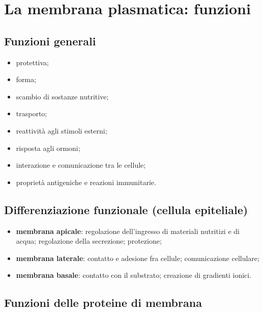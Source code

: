 \section{La membrana plasmatica: funzioni}

\subsection{Funzioni generali}

\begin{itemize}
  \item protettiva;
  \item forma;
  \item scambio di sostanze nutritive;
  \item trasporto;
  \item reattività agli stimoli esterni;
  \item risposta agli ormoni;
  \item interazione e comunicazione tra le cellule;
  \item proprietà antigeniche e reazioni immunitarie.
\end{itemize}

\subsection{Differenziazione funzionale (cellula epiteliale)}

\begin{itemize}
  \item \textbf{membrana apicale}: regolazione dell'ingresso di materiali nutritizi e di acqua; regolazione della secrezione; protezione;
  \item \textbf{membrana laterale}: contatto e adesione fra cellule; comunicazione cellulare;
  \item \textbf{membrana basale}: contatto con il substrato; creazione di gradienti ionici.
\end{itemize}

\subsection{Funzioni delle proteine di membrana}

